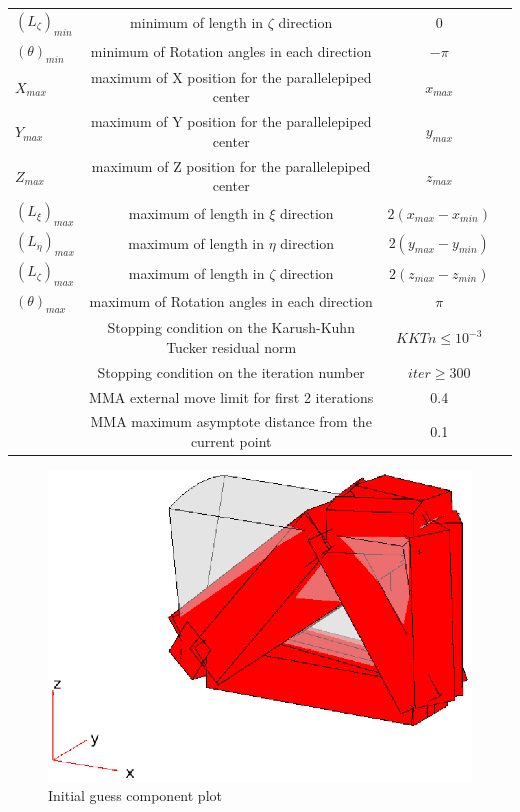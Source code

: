 \begin{table}[h]
\begin{tabular}{lccc}
    		$(L_\zeta)_{min}$ & minimum of length in $\zeta$ direction & $0$\\
    		$(\theta)_{min}$ & minimum of Rotation angles in each direction & $-\pi$\\
    		$X_{max}$ & maximum of X position for the parallelepiped center & $x_{max}$\\
    		$Y_{max}$ & maximum of Y position for the parallelepiped center & $y_{max}$\\
    		$Z_{max}$ & maximum of Z position for the parallelepiped center & $z_{max}$\\
    		$(L_\xi)_{max}$ & maximum of length in $\xi$ direction & $2(x_{max}-x_{min})$\\
    		$(L_\eta)_{max}$ & maximum of length in $\eta$ direction & $2(y_{max}-y_{min})$\\
    		$(L_\zeta)_{max}$ & maximum of length in $\zeta$ direction & $2(z_{max}-z_{min})$\\
    		$(\theta)_{max}$ & maximum of Rotation angles in each direction & $\pi$\\
    		 & Stopping condition on the Karush-Kuhn Tucker residual norm & $KKTn\leq10^{-3}$\\ 
    		& Stopping condition on the iteration number & $iter \geq 300$ \\
    		& MMA external move limit for first 2 iterations & 0.4 \\
    		& MMA maximum asymptote distance from the current point & 0.1 \\
             \hline
             \end{tabular}
             \end{table}
  \begin{figure}[ht]
      \centering
      \includegraphics[width=\textwidth]{images/Ch3/Initial_guess_MNA_3D}
      \caption{Initial guess component plot}
      \label{fig.3.35}
      \end{figure}
